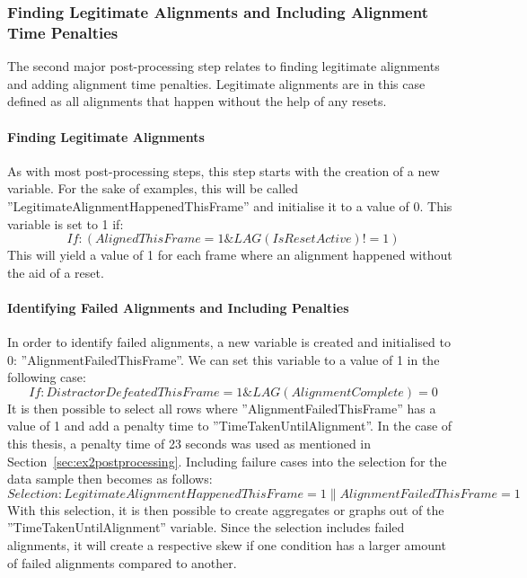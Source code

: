 \subsubsection{Finding Legitimate Alignments and Including Alignment Time Penalties}
The second major post-processing step relates to finding legitimate alignments and adding alignment time penalties. Legitimate alignments are in this case defined as all alignments that happen without the help of any resets.  

\paragraph{Finding Legitimate Alignments}
As with most post-processing steps, this step starts with the creation of a new variable. For the sake of examples, this will be called ''LegitimateAlignmentHappenedThisFrame'' and initialise it to a value of 0. This variable is set to 1 if:
$$
If: (AlignedThisFrame = 1 \& LAG(IsResetActive) != 1)
$$
This will yield a value of 1 for each frame where an alignment happened without the aid of a reset. 

\paragraph{Identifying Failed Alignments and Including Penalties}
In order to identify failed alignments, a new variable is created and initialised to 0: ''AlignmentFailedThisFrame''. We can set this variable to a value of 1 in the following case:
$$
If: DistractorDefeatedThisFrame = 1 \& LAG(AlignmentComplete) = 0
$$
It is then possible to select all rows where ''AlignmentFailedThisFrame'' has a value of 1 and add a penalty time to ''TimeTakenUntilAlignment''. In the case of this thesis, a penalty time of 23 seconds was used as mentioned in Section~\ref{sec:ex2postprocessing}. Including failure cases into the selection for the data sample then becomes as follows:
$$
Selection: LegitimateAlignmentHappenedThisFrame = 1 \| AlignmentFailedThisFrame = 1
$$
With this selection, it is then possible to create aggregates or graphs out of the ''TimeTakenUntilAlignment'' variable. Since the selection includes failed alignments, it will create a respective skew if one condition has a larger amount of failed alignments compared to another. 